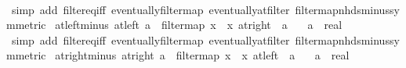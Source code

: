 \begin{isabellebody}
%
\isadelimproof
\ \ %
\endisadelimproof
%
\isatagproof
{}\isamarkupfalse%
\ {\isacharparenleft}{\kern0pt}simp\ add{\isacharcolon}{\kern0pt}\ filter{\isacharunderscore}{\kern0pt}eq{\isacharunderscore}{\kern0pt}iff\ eventually{\isacharunderscore}{\kern0pt}filtermap\ eventually{\isacharunderscore}{\kern0pt}at{\isacharunderscore}{\kern0pt}filter\ filtermap{\isacharunderscore}{\kern0pt}nhds{\isacharunderscore}{\kern0pt}minus{\isacharbrackleft}{\kern0pt}symmetric{\isacharbrackright}{\kern0pt}{\isacharparenright}{\kern0pt}%
\endisatagproof
{\isafoldproof}%
%
\isadelimproof
\isanewline
%
\endisadelimproof
\isanewline
{}\isamarkupfalse%
\ at{\isacharunderscore}{\kern0pt}left{\isacharunderscore}{\kern0pt}minus{\isacharcolon}{\kern0pt}\ {\isachardoublequoteopen}at{\isacharunderscore}{\kern0pt}left\ a\ {\isacharequal}{\kern0pt}\ filtermap\ {\isacharparenleft}{\kern0pt}{\isasymlambda}x{\isachardot}{\kern0pt}\ {\isacharminus}{\kern0pt}\ x{\isacharparenright}{\kern0pt}\ {\isacharparenleft}{\kern0pt}at{\isacharunderscore}{\kern0pt}right\ {\isacharparenleft}{\kern0pt}{\isacharminus}{\kern0pt}\ a{\isacharparenright}{\kern0pt}{\isacharparenright}{\kern0pt}{\isachardoublequoteclose}\isanewline
\ \ \ a\ {\isacharcolon}{\kern0pt}{\isacharcolon}{\kern0pt}\ real\isanewline
%
\isadelimproof
\ \ %
\endisadelimproof
%
\isatagproof
{}\isamarkupfalse%
\ {\isacharparenleft}{\kern0pt}simp\ add{\isacharcolon}{\kern0pt}\ filter{\isacharunderscore}{\kern0pt}eq{\isacharunderscore}{\kern0pt}iff\ eventually{\isacharunderscore}{\kern0pt}filtermap\ eventually{\isacharunderscore}{\kern0pt}at{\isacharunderscore}{\kern0pt}filter\ filtermap{\isacharunderscore}{\kern0pt}nhds{\isacharunderscore}{\kern0pt}minus{\isacharbrackleft}{\kern0pt}symmetric{\isacharbrackright}{\kern0pt}{\isacharparenright}{\kern0pt}%
\endisatagproof
{\isafoldproof}%
%
\isadelimproof
\isanewline
%
\endisadelimproof
\isanewline
{}\isamarkupfalse%
\ at{\isacharunderscore}{\kern0pt}right{\isacharunderscore}{\kern0pt}minus{\isacharcolon}{\kern0pt}\ {\isachardoublequoteopen}at{\isacharunderscore}{\kern0pt}right\ a\ {\isacharequal}{\kern0pt}\ filtermap\ {\isacharparenleft}{\kern0pt}{\isasymlambda}x{\isachardot}{\kern0pt}\ {\isacharminus}{\kern0pt}\ x{\isacharparenright}{\kern0pt}\ {\isacharparenleft}{\kern0pt}at{\isacharunderscore}{\kern0pt}left\ {\isacharparenleft}{\kern0pt}{\isacharminus}{\kern0pt}\ a{\isacharparenright}{\kern0pt}{\isacharparenright}{\kern0pt}{\isachardoublequoteclose}\isanewline
\ \ \ a\ {\isacharcolon}{\kern0pt}{\isacharcolon}{\kern0pt}\ real\isanewline

\end{isabellebody}
